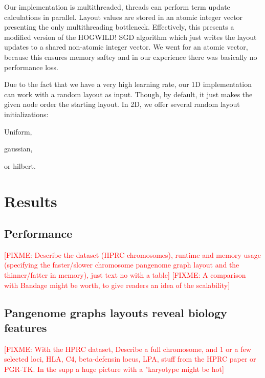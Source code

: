 \documentclass{bioinfo}
\theoremstyle{definition}
\newcommand{\red}[1]{{\textcolor{Red}{#1}}}
\newcommand{\FIXME}[1]{\red{[FIXME: #1]}}
\begin{document}
	Our implementation is multithreaded, threads can perform term update calculations in parallel. Layout values are stored in an atomic integer vector presenting the only multithreading bottleneck. Effectively, this presents a modified version of the HOGWILD! SGD algorithm which just writes the layout updates to a shared non-atomic integer vector. We went for an atomic vector, because this ensures memory saftey and in our experience there was basically no performance loss.
	
	Due to the fact that we have a very high learning rate, our 1D implementation can work with a random layout as input. Though, by default, it just makes the given node order the starting layout. In 2D, we offer several random layout initializations: 
		\begin{enumerate*}[label=(\roman*)]
		\item Uniform,
		\item gaussian,
		\item or hilbert.
	\end{enumerate*}

    \iffalse
    Fig. 1: Describe how our approach works, especially a single update operation (Fig. \ref{fig:sketches}). Explanation of 1D graph updating in Figures \ref{fig:1d_before_update}-\ref{fig:1d_after_update}. Explanation of 2D graph updating in Figures \ref{fig:2d_before_update}-\ref{fig:2d_after_update}. Zipfian distribution.

    
    \fi

    \section{Results}
    \label{sec:results}

    \subsection{Performance}
	\FIXME{Describe the dataset (HPRC chromosomes), runtime and memory usage (specifying the faster/slower chromosome pangenome graph layout and the thinner/fatter in memory), just text no with a table}
    \FIXME{A comparison with Bandage might be worth, to give readers an idea of the scalability}
	

    \subsection{Pangenome graphs layouts reveal biology features}
	\FIXME{With the HPRC dataset, Describe a full chromosome, and 1 or a few selected loci, HLA, C4, beta-defensin locus, LPA, stuff from the HPRC paper or PGR-TK.
	In the supp a huge picture with a "karyotype might be hot}
\end{document}
